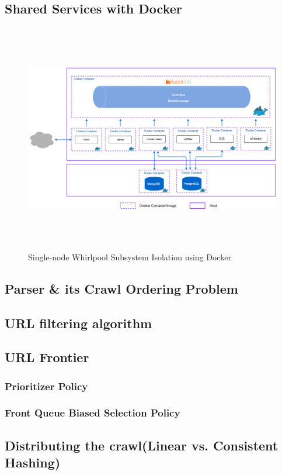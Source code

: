 \subsection{Shared Services with Docker}
\begin{figure}[h!]
  \centering
  \includegraphics[width=18cm,height=10cm,keepaspectratio]{../media/crawler/multi-container-deploy.png}
  \caption{Single-node Whirlpool Subsystem Isolation using Docker}
  \label{fig:multicontainer}
\end{figure}


\pagebreak

\subsection{Parser \& its Crawl Ordering Problem}
\subsection{URL filtering algorithm}
\subsection{URL Frontier}
\subsubsection{Prioritizer Policy}
\subsubsection{Front Queue Biased Selection Policy}
\subsection{Distributing the crawl(Linear vs. Consistent Hashing)}

\pagebreak